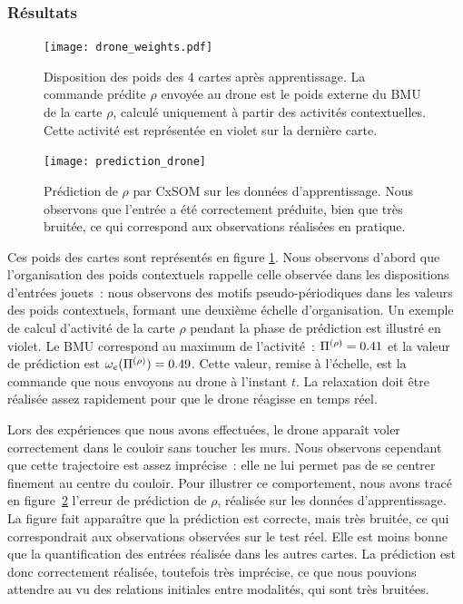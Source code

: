 \documentclass[../main]{subfiles}
\begin{document}
\subsubsection{Résultats}
\begin{figure}
	\texttt{[image: drone\_weights.pdf]}
	\caption{Disposition des poids des 4 cartes après apprentissage. La commande prédite $\rho$ envoyée au drone est le poids externe du BMU de la carte $\rho$, calculé uniquement à partir des activités contextuelles. Cette activité est représentée en violet sur la dernière carte.}
	\label{fig:drone_w}
	\end{figure}

	\begin{figure}
		\centering\texttt{[image: prediction\_drone]}
		\caption{Prédiction de $\rho$ par CxSOM sur les données d'apprentissage. Nous observons que l'entrée a été correctement préduite, bien que très bruitée, ce qui correspond aux observations réalisées en pratique. \label{fig:pred_drone}}
	\end{figure}

Ces poids des cartes sont représentés en figure \ref{fig:drone_w}. 
Nous observons d'abord que l'organisation des poids contextuels rappelle celle observée dans les dispositions d'entrées jouets~: nous observons des motifs pseudo-périodiques dans les valeurs des poids contextuels, formant une deuxième échelle d'organisation. Un exemple de calcul d'activité de la carte $\rho$ pendant la phase de prédiction est illustré en violet. Le BMU correspond au maximum de l'activité~: $\Pi^{({\rho})} = 0.41$ et la valeur de prédiction est $\omega_e(\Pi^{({\rho})}) = 0.49$. Cette valeur, remise à l'échelle, est la commande que nous envoyons au drone à l'instant $t$.
La relaxation doit être réalisée assez rapidement pour que le drone réagisse en temps réel.

Lors des expériences que nous avons effectuées, le drone apparaît voler correctement dans le couloir sans toucher les murs. Nous observons cependant que cette trajectoire est assez imprécise~: elle ne lui permet pas de se centrer finement au centre du couloir. Pour illustrer ce comportement, nous avons tracé en figure~\ref{fig:pred_drone} l'erreur de prédiction de $\rho$, réalisée sur les données d'apprentissage. La figure fait apparaître que la prédiction est correcte, mais très bruitée, ce qui correspondrait aux observations observées sur le test réel. Elle est moins bonne que la quantification des entrées réalisée dans les autres cartes. 
La prédiction est donc correctement réalisée, toutefois très imprécise, ce que nous pouvions attendre au vu des relations initiales entre modalités, qui sont très bruitées.
\end{document}
